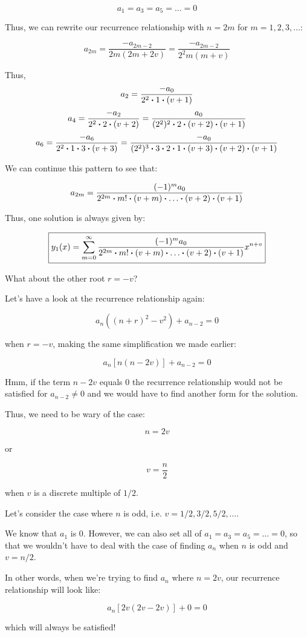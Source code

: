 \documentclass{report}
\begin{document}
{$$a_1=a_3=a_5=\dots=0$$

Thus, we can rewrite our recurrence relationship with $n=2m$ for $m=1,2,3,\dots$:

$$a_{2m}=\frac{-a_{2m-2}}{2m(2m+2v)}
= \frac{-a_{2m-2}}{2^2m(m+v)}$$

Thus,
$$a_2 = \frac{-a_{0}}{2^2\vdot1\vdot(v+1)}$$
$$a_4 = \frac{-a_{2}}{2^2\vdot2\vdot(v+2)} = \frac{a_0}{(2^2)^2\vdot2\vdot(v+2)\vdot(v+1)}$$
$$a_6 = \frac{-a_{6}}{2^2\vdot1\vdot3\vdot(v+3)} = \frac{-a_0}{(2^2)^3\vdot3\vdot2\vdot1\vdot(v+3)\vdot(v+2)\vdot(v+1)}$$

We can continue this pattern to see that:

$$a_{2m}=\frac{(-1)^ma_0}{2^{2m}\vdot m! \vdot(v+m)\vdot\dots\vdot(v+2)\vdot(v+1)} $$


Thus, one solution is always given by:


$$\boxed{
	y_1(x) = \sum_{m=0}^\infty \frac{(-1)^ma_0}{2^{2m}\vdot m! \vdot(v+m)\vdot\dots\vdot(v+2)\vdot(v+1)} x^{n+v}
}$$

What about the other root $r = -v$?

Let's have a look at the recurrence relationship again:

$$a_n((n+r)^2-v^2)+a_{n-2} = 0$$

when $r=-v$, making the same simplification we made earlier:


$$a_n[n(n-2v)]+a_{n-2} = 0$$

Hmm, if the term $n-2v$ equals 0 the recurrence relationship would not be satisfied for $a_{n-2} \neq 0$ and we would have to find another form for the solution.

Thus, we need to be wary of the case:

$$n = 2v$$

or 

$$v = \frac{n}{2}$$

when $v$ is a discrete multiple of $1/2$.

Let's consider the case where $n$ is odd, i.e. $v = 1/2, 3/2, 5/2, \dots$. 

We know that $a_1$ is 0. However, we can also set all of $a_1=a_3=a_5=\dots=0$, so that we wouldn't have to deal with the case of finding $a_n$ when $n$ is odd and $v = n/2$.

In other words, when we're trying to find $a_n$ where $n=2v$, our recurrence relationship will look like:

$$a_n[2v(2v-2v)]+0 = 0$$

which will always be satisfied!

}
\end{document}

